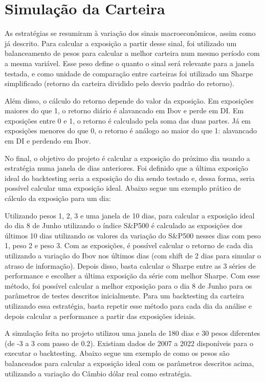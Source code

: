 \section{Simulação da Carteira}

As estratégias se resumiram à variação dos sinais macroeconômicos, assim como já descrito. Para calcular a exposição a partir desse sinal, foi utilizado um balanceamento de pesos para calcular a melhor carteira num mesmo período com a mesma variável. Esse peso define o quanto o sinal será relevante para a janela testada, e como unidade de comparação entre carteiras foi utilizado um Sharpe simplificado (retorno da carteira dividido pelo desvio padrão do retorno). 

 

Além disso, o cálculo do retorno depende do valor da exposição. Em exposições maiores do que 1, o retorno diário é alavancado em Ibov e perde em DI. Em exposições entre 0 e 1, o retorno é calculado pela soma das duas partes. Já em exposições menores do que 0, o retorno é análogo ao maior do que 1: alavancado em DI e perdendo em Ibov.

No final, o objetivo do projeto é calcular a exposição do próximo dia usando a estratégia numa janela de dias anteriores. Foi definido que a última exposição ideal do backtesting seria a exposição do dia sendo testado e, dessa forma, seria possível calcular uma exposição ideal. Abaixo segue um exemplo prático de cálculo da exposição para um dia:

Utilizando pesos 1, 2, 3 e uma janela de 10 dias, para calcular a exposição ideal do dia 8 de Junho utilizando o índice S\&P500 é calculado as exposições dos últimos 10 dias utilizando os valores da variação do S\&P500 nesses dias com peso 1, peso 2 e peso 3. Com as exposições, é possível calcular o retorno de cada dia utilizando a variação do Ibov nos últimos dias (com shift de 2 dias para simular o atraso de informação). Depois disso, basta calcular o Sharpe entre as 3 séries de performance e escolher a última exposição da série com melhor Sharpe. Com esse método, foi possível calcular a melhor exposição para o dia 8 de Junho para os parâmetros de testes descritos inicialmente. Para um backtesting da carteira utilizando essa estratégia, basta repetir esse método para cada dia da análise e depois calcular a performance a partir das exposições ideiais.

A simulação feita no projeto utilizou uma janela de 180 dias e 30 pesos diferentes (de -3 a 3 com passo de 0.2). Existiam dados de 2007 a 2022 disponíveis para o executar o backtesting. Abaixo segue um exemplo de como os pesos são balanceados para calcular a exposição ideal com os parâmetros descritos acima, utilizando a variação do Câmbio dólar real como estratégia.

